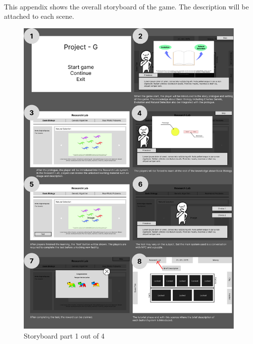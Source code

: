 \documentclass[12pt,oneside,openright,a4paper]{cpe-english-project}
\begin{document}
\makeatletter
\g@addto@macro{\UrlBreaks}{\UrlOrds}
\makeatother






 \\
This appendix shows the overall storyboard of the game. The description will be attached to each scene.

\begin{figure}[!h]\centering \includegraphics[width=14cm]{appendix-a-figure/storyboard1.png} \caption{Storyboard part 1 out of 4} \end{figure}
\end{document}
